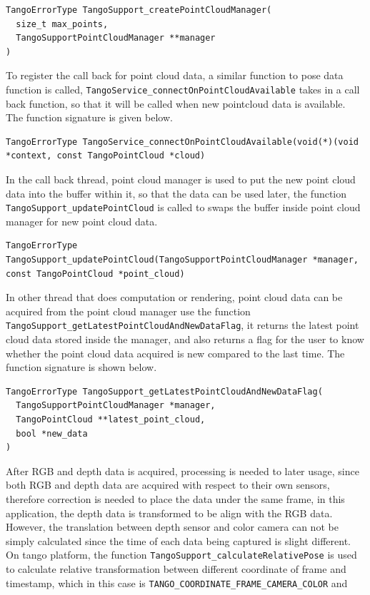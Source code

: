 \documentclass[12pt,twoside]{article}
\begin{document}
\begin{lstlisting}
TangoErrorType TangoSupport_createPointCloudManager(
  size_t max_points,
  TangoSupportPointCloudManager **manager
)
\end{lstlisting}
To register the call back for point cloud data, a similar function to pose data function is called, \verb|TangoService_connectOnPointCloudAvailable| takes in a call back function, so that it will be called when new pointcloud data is available. The function signature is given below.
\begin{lstlisting}
TangoErrorType TangoService_connectOnPointCloudAvailable(void(*)(void *context, const TangoPointCloud *cloud)
\end{lstlisting}
In the call back thread, point cloud manager is used to put the new point cloud data into the buffer within it, so that the data can be used later, the function\\
 \verb|TangoSupport_updatePointCloud| is called to swaps the buffer inside point cloud manager for new point cloud data.\\
\begin{lstlisting}
TangoErrorType TangoSupport_updatePointCloud(TangoSupportPointCloudManager *manager, const TangoPointCloud *point_cloud)
\end{lstlisting}
In other thread that does computation or rendering, point cloud data can be acquired from the point cloud manager use the function \\
\verb|TangoSupport_getLatestPointCloudAndNewDataFlag|, it returns the latest point cloud data stored inside the manager, and also returns a flag for the user to know whether the point cloud data acquired is new compared to the last time. The function signature is shown below.\\
\begin{lstlisting}
TangoErrorType TangoSupport_getLatestPointCloudAndNewDataFlag(
  TangoSupportPointCloudManager *manager,
  TangoPointCloud **latest_point_cloud,
  bool *new_data
)
\end{lstlisting}
After RGB and depth data is acquired, processing is needed to later usage, since both RGB and depth data are acquired with respect to their own sensors, therefore correction is needed to place the data under the same frame, in this application, the depth data is transformed to be align with the RGB data. However, the translation between depth sensor and color camera can not be simply calculated since the time of each data being captured is slight different. On tango platform, the function \verb|TangoSupport_calculateRelativePose| is used to calculate relative transformation between different coordinate of frame and timestamp, which in this case is \verb|TANGO_COORDINATE_FRAME_CAMERA_COLOR| and \\
\end{document}
